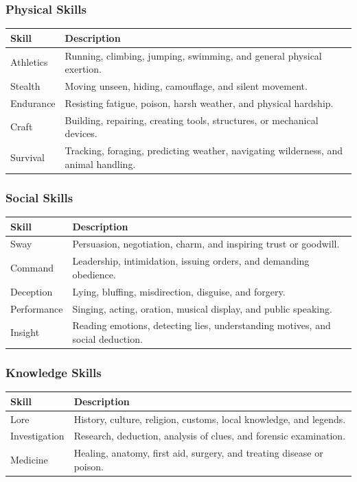 \subsubsection{Physical Skills}

\begin{tabular}{@{}lp{10cm}@{}}
\toprule
\textbf{Skill} & \textbf{Description} \\
\midrule
Athletics & Running, climbing, jumping, swimming, and general physical exertion. \\
Stealth & Moving unseen, hiding, camouflage, and silent movement. \\
Endurance & Resisting fatigue, poison, harsh weather, and physical hardship. \\
Craft & Building, repairing, creating tools, structures, or mechanical devices. \\
Survival & Tracking, foraging, predicting weather, navigating wilderness, and animal handling. \\
\bottomrule
\end{tabular}

\subsubsection{Social Skills}

\begin{tabular}{@{}lp{10cm}@{}}
\toprule
\textbf{Skill} & \textbf{Description} \\
\midrule
Sway & Persuasion, negotiation, charm, and inspiring trust or goodwill. \\
Command & Leadership, intimidation, issuing orders, and demanding obedience. \\
Deception & Lying, bluffing, misdirection, disguise, and forgery. \\
Performance & Singing, acting, oration, musical display, and public speaking. \\
Insight & Reading emotions, detecting lies, understanding motives, and social deduction. \\
\bottomrule
\end{tabular}

\subsubsection{Knowledge Skills}

\begin{tabular}{@{}lp{10cm}@{}}
\toprule
\textbf{Skill} & \textbf{Description} \\
\midrule
Lore & History, culture, religion, customs, local knowledge, and legends. \\
Investigation & Research, deduction, analysis of clues, and forensic examination. \\
Medicine & Healing, anatomy, first aid, surgery, and treating disease or poison. \\
\bottomrule
\end{tabular}


